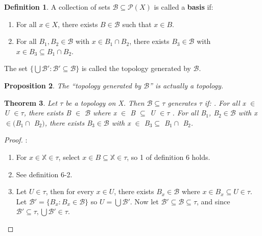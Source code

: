 \documentclass{amsart}
\theoremstyle{plain}
\newtheorem{theorem}{Theorem}
\newtheorem{proposition}[theorem]{Proposition}
\theoremstyle{definition}
\newtheorem{definition}[theorem]{Definition}
\theoremstyle{remark}
\begin{document}
	\begin{definition}
		A collection of sets \(\mathcal{B}\subseteq\mathcal{P}(X)\) is
		called a \textbf{basis} if:
		\begin{enumerate}
			\item For all \(x\in X\), there exists \(B\in\mathcal{B}\) such that
			\(x\in B\).
			\item  For all \(B_1,B_2 \in \mathcal{B}\) with \(x \in B_1 \cap B_2\), there exists \(B_3 \in \mathcal{B}\) with
			\(x\in B_3 \subseteq B_1 \cap B_2\).
		\end{enumerate}
	  The set \(\{\bigcup\mathcal{B}':\mathcal{B}'\subseteq\mathcal{B}\}\)
		is called the topology generated by \(\mathcal{B}\).
	\end{definition}

	\begin{proposition}
		The ``topology generated by \(\mathcal{B}\)'' is actually a topology.
	\end{proposition}

	\begin{theorem}
	Let $\tau$ be a topology on X. Then $\mathcal{B} \subseteq \tau$ generates $\tau$ if:
	. For all x $\in$ U $\in \tau$, there exists B $\in$ $\mathcal{B}$ where x $\in$ B $\subseteq$ U $\in \tau$
	. For all B$_1$, B$_2 \in \mathcal{B}$ with x $\in ($B$_1 \cap$ B$_2)$, there exists B$_3 \in \mathcal{B}$ with x $\in$ B$_3 \subseteq$ B$_1 \cap$ B$_2$.
\end{theorem}
\begin{proof}:\newline
	\begin{enumerate}
		\item For $x \in \mathbb{X} \in \tau$, select $x \in B \subseteq \mathbb{X} \in \tau$, so 1 of definition 6 holds.
		\item See definition 6-2.
		\item Let $U \in \tau$, then for every $x \in U$, there exists $B_x \in \mathcal{B}$ where $x \in B_x \subseteq U \in \tau$. Let $\mathcal{B'} = \lbrace B_x : B_x \in \mathcal{B} \rbrace$ so $U = \bigcup \mathcal{B'}$. Now let $\mathcal{B'} \subseteq \mathcal{B} \subseteq \tau$, and since $\mathcal{B'} \subseteq \tau, \bigcup \mathcal{B'} \in \tau$.
		\end{enumerate}
\end{proof}
\end{document}
